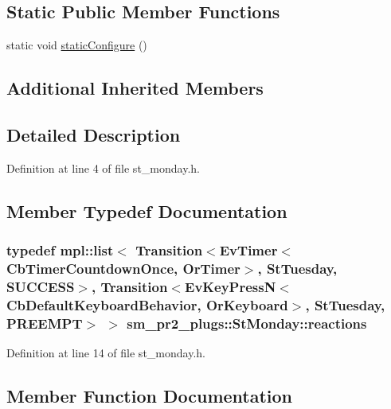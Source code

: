 \subsection*{Static Public Member Functions}
\begin{DoxyCompactItemize}
\item 
static void \hyperlink{structsm__pr2__plugs_1_1StMonday_a30bcd4fcec8ea3caeb28bb29ef62167c}{static\+Configure} ()
\end{DoxyCompactItemize}
\subsection*{Additional Inherited Members}


\subsection{Detailed Description}


Definition at line 4 of file st\+\_\+monday.\+h.



\subsection{Member Typedef Documentation}
\subsubsection[{\texorpdfstring{reactions}{reactions}}]{\setlength{\rightskip}{0pt plus 5cm}typedef mpl\+::list$<$ Transition$<$Ev\+Timer$<$Cb\+Timer\+Countdown\+Once, {\bf Or\+Timer}$>$, {\bf St\+Tuesday}, {\bf S\+U\+C\+C\+E\+SS}$>$, Transition$<$Ev\+Key\+PressN$<$Cb\+Default\+Keyboard\+Behavior, {\bf Or\+Keyboard}$>$, {\bf St\+Tuesday}, {\bf P\+R\+E\+E\+M\+PT}$>$ $>$ {\bf sm\+\_\+pr2\+\_\+plugs\+::\+St\+Monday\+::reactions}}\hypertarget{structsm__pr2__plugs_1_1StMonday_a3d5035b058247dc9e30664ff2b50823c}{}\label{structsm__pr2__plugs_1_1StMonday_a3d5035b058247dc9e30664ff2b50823c}


Definition at line 14 of file st\+\_\+monday.\+h.



\subsection{Member Function Documentation}
